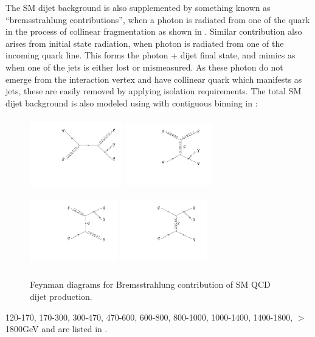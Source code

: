 The SM dijet background is also supplemented by something known as ``bremsstrahlung contributions'', when a photon is radiated from one of the quark in
the process of collinear fragmentation as shown in \fig{\ref{fig:qstarBkgjjGamma}}. Similar contribution also arises from initial state radiation,
 when photon is radiated from one of the incoming quark line. This forms the photon + dijet final state, and mimics as \gamjet when one of the jets 
is either lost or mismeasured. As these photon do not emerge from the interaction vertex and have collinear quark which manifests as jets, these are
 easily removed by applying isolation requirements. The total SM dijet background is also modeled using \pythia with contiguous binning in \pt :
\begin{figure}[h!]
\centering
  \includegraphics[width=4cm,height=3.2cm]{ch5/plots/FeynmanDiag/qgToqgGamma_S.pdf}
  \includegraphics[width=3.8cm,height=3.2cm]{ch5/plots/FeynmanDiag/qgToqgGamma_T.pdf}
  \includegraphics[width=3.8cm,height=3.2cm]{ch5/plots/FeynmanDiag/qgToqgGamma2_T.pdf}
  \includegraphics[width=3.8cm,height=3.2cm]{ch5/plots/FeynmanDiag/qqToqqGamma_T.pdf}
 \caption{Feynman diagrams for Bremsstrahlung contribution of SM QCD dijet production.}
\label{fig:qstarBkgjjGamma}
\end{figure}
120-170, 170-300, 300-470, 470-600, 600-800, 800-1000, 1000-1400, 1400-1800, $>$1800\unit{GeV} and are listed in \tab{\ref{Table:BkgSamples}}.


